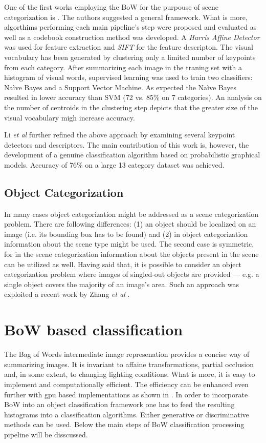 \documentclass[a4paper,12pt]{article}
\begin{document}
  One of the first works employing the BoW for the purpouse of scene categorization is \cite{csurka2004visual}. The authors suggested a general framework. What is more, algorthims performing each main pipeline's step were proposed and evaluated as well as a codebook construction method was developed. A \emph{Harris Affine Detector} was used for feature extraction and \emph{SIFT} for the feature descripton. The visual vocabulary has been generated by clustering only a limited number of keypoints from each category. After summarizing each image in the traning set with a histogram of visual words, supervised learning was used to train two classifiers: Na\`ive Bayes and a Support Vector Machine. As expected the Na\`ive Bayes resulted in lower accuracy than SVM (72 vs. 85\% on 7 categories). An analysis on the number of centroids in the clustering step depicts that the greater size of the visual vocabulary migh increase accuracy. 
  
  Li \emph{et al} further refined the above approach by examining several keypoint detectors and descriptors. The main contribution of this work is, however, the development of a genuine classification algorithm based on probabilistic graphical models. Accuracy of 76\% on a large 13 category dataset was achieved.
  
  \subsection{Object Categorization}
  
  In many cases object categorization might be addressed as a scene categorization problem. There are following differences: (1) an object should be localized on an image (i.e. its bounding box has to be found) and (2) in object categorization information about the scene type might be used. The second case is symmetric, for in the scene categorization information about the objects present in the scene can be utilized as well. Having said that, it is possible to consider an object categorization problem where images of singled-out objects are provided --- e.g. a single object covers the majority of an image's area. Such an approach was exploited a recent work by Zhang \emph{et al} \cite{zhangcategory}. 
  

\section{BoW based classification}

	The Bag of Words intermediate image represenation provides a concise way of summarizing images. It is invariant to affaine transformations, partial occlusion and, in some extent, to changing lighting conditions. What is more, it is easy to implement and computationally efficient. The efficiency can be enhanced even further with gpu based implementations as shown in \cite{van2011empowering}. In order to incorporate BoW into an object classification framework one has to feed the resulting histograms into a classification algorithms. Either generative or discriminative methods can be used. Below the main steps of BoW classification processing pipeline will be disscussed.
\end{document}
